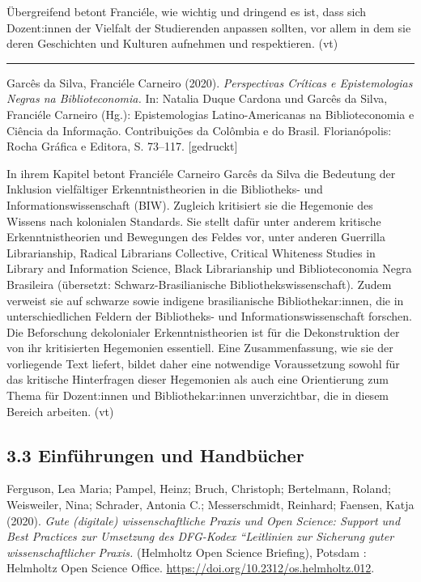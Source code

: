 \documentclass[a4paper,
fontsize=11pt,
oneside,
numbers=noperiodatend,
parskip=half-,
bibliography=totoc,
final
]{scrartcl}
\begin{document}
Übergreifend betont Franciéle, wie wichtig und dringend es ist, dass
sich Dozent:innen der Vielfalt der Studierenden anpassen sollten, vor
allem in dem sie deren Geschichten und Kulturen aufnehmen und
respektieren. (vt)

\begin{center}\rule{0.5\linewidth}{0.5pt}\end{center}

Garcês da Silva, Franciéle Carneiro (2020). \emph{Perspectivas Críticas
e Epistemologias Negras na Biblioteconomia.} In: Natalia Duque Cardona
und Garcês da Silva, Franciéle Carneiro (Hg.): Epistemologias
Latino-Americanas na Biblioteconomia e Ciência da Informação.
Contribuições da Colômbia e do Brasil. Florianópolis: Rocha Gráfica e
Editora, S. 73--117. {[}gedruckt{]}

In ihrem Kapitel betont Franciéle Carneiro Garcês da Silva die Bedeutung
der Inklusion vielfältiger Erkenntnistheorien in die Bibliotheks- und
Informationswissenschaft (BIW). Zugleich kritisiert sie die Hegemonie
des Wissens nach kolonialen Standards. Sie stellt dafür unter anderem
kritische Erkenntnistheorien und Bewegungen des Feldes vor, unter
anderen Guerrilla Librarianship, Radical Librarians Collective, Critical
Whiteness Studies in Library and Information Science, Black
Librarianship und Biblioteconomia Negra Brasileira (übersetzt:
Schwarz-Brasilianische Bibliothekswissenschaft). Zudem verweist sie auf
schwarze sowie indigene brasilianische Bibliothekar:innen, die in
unterschiedlichen Feldern der Bibliotheks- und Informationswissenschaft
forschen. Die Beforschung dekolonialer Erkenntnistheorien ist für die
Dekonstruktion der von ihr kritisierten Hegemonien essentiell. Eine
Zusammenfassung, wie sie der vorliegende Text liefert, bildet daher eine
notwendige Voraussetzung sowohl für das kritische Hinterfragen dieser
Hegemonien als auch eine Orientierung zum Thema für Dozent:innen und
Bibliothekar:innen unverzichtbar, die in diesem Bereich arbeiten. (vt)

\hypertarget{einfuxfchrungen-und-handbuxfccher}{%
\subsection{3.3 Einführungen und
Handbücher}\label{einfuxfchrungen-und-handbuxfccher}}

Ferguson, Lea Maria; Pampel, Heinz; Bruch, Christoph; Bertelmann,
Roland; Weisweiler, Nina; Schrader, Antonia C.; Messerschmidt, Reinhard;
Faensen, Katja (2020). \emph{Gute (digitale) wissenschaftliche Praxis
und Open Science: Support und Best Practices zur Umsetzung des DFG-Kodex
``Leitlinien zur Sicherung guter wissenschaftlicher Praxis.} (Helmholtz
Open Science Briefing), Potsdam : Helmholtz Open Science Office.
\url{https://doi.org/10.2312/os.helmholtz.012}.
\end{document}
